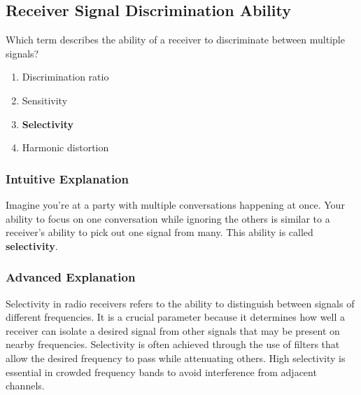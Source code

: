 \subsection{Receiver Signal Discrimination Ability}
\label{T7A04}

\begin{tcolorbox}[colback=gray!10!white,colframe=black!75!black,title=T7A04]
Which term describes the ability of a receiver to discriminate between multiple signals?
\begin{enumerate}[noitemsep]
    \item Discrimination ratio
    \item Sensitivity
    \item \textbf{Selectivity}
    \item Harmonic distortion
\end{enumerate}
\end{tcolorbox}

\subsubsection*{Intuitive Explanation}
Imagine you're at a party with multiple conversations happening at once. Your ability to focus on one conversation while ignoring the others is similar to a receiver's ability to pick out one signal from many. This ability is called \textbf{selectivity}.

\subsubsection*{Advanced Explanation}
Selectivity in radio receivers refers to the ability to distinguish between signals of different frequencies. It is a crucial parameter because it determines how well a receiver can isolate a desired signal from other signals that may be present on nearby frequencies. Selectivity is often achieved through the use of filters that allow the desired frequency to pass while attenuating others. High selectivity is essential in crowded frequency bands to avoid interference from adjacent channels.